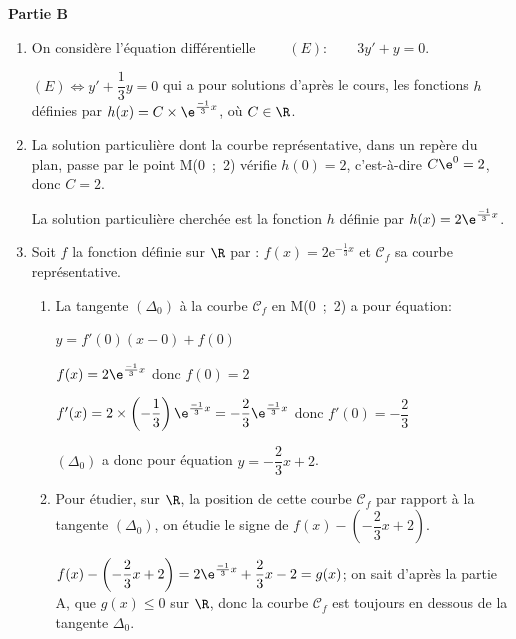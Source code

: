 \textbf{Partie B}

\medskip

\begin{enumerate}
\item On considère l'équation différentielle
$\qquad (E) :\qquad  3y' + y = 0.$



$(E) \iff y'+\dfrac{1}{3}y=0$ qui a pour solutions d'après le cours, les fonctions $h$ définies par $h(x)=C\times \e^{\frac{-1}{3}x}$, où $C\in\R$.

\item La solution particulière dont la courbe représentative, dans un repère du plan, passe par le point M(0~;~2) vérifie $h(0)=2$, c'est-à-dire $C\e^{0}=2$, donc $C=2$.

La solution particulière cherchée est la fonction $h$ définie par $h(x)=2\e^{\frac{-1}{3}x}$.

\item Soit $f$ la fonction définie sur $\R$ par :
$f(x) = 2\text{e}^{- \frac{1}{3}x}$
 et $\mathcal{C}_f$ sa courbe représentative.
 
	\begin{enumerate}
		\item La tangente $\left(\Delta_0\right)$ à la courbe $\mathcal{C}_f$ en M(0~;~2) a pour équation:
		
$y=f'(0)\left (x-0\right ) + f(0)$		

$f(x)=2\e^{\frac{-1}{3}x}$ donc $f(0)=2$

$f'(x)= 2\times \left ( -\dfrac{1}{3} \right ) \e^{\frac{-1}{3}x} = -\dfrac{2}{3}\e^{\frac{-1}{3}x}$ donc $f'(0)=-\dfrac{2}{3}$
		
$\left(\Delta_0\right)$ a donc pour équation $y= - \dfrac{2}{3}x + 2$.

		\item Pour étudier, sur $\R$, la position de cette courbe  $\mathcal{C}_f$ par rapport à la tangente $\left(\Delta_0\right)$, on étudie le signe de $f(x)-\left ( -\dfrac{2}{3}x +2\right )$.
		
$f(x)-\left ( -\dfrac{2}{3}x +2\right ) = 2\e^{\frac{-1}{3}x} +\dfrac{2}{3}x - 2 = g(x)$; on sait d'après la partie A, que $g(x)\leqslant 0$ sur $\R$, donc la courbe $\mathcal{C}_f$ est toujours en dessous de la tangente $\Delta_0$.		
		
	\end{enumerate}
\end{enumerate}

\bigskip

